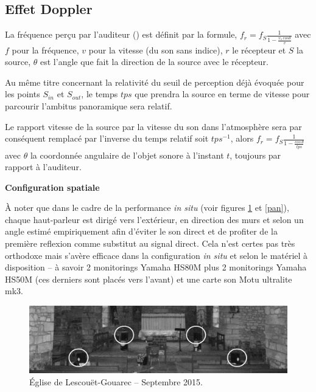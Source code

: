 \normalfont

\subsection*{Effet Doppler}

La fr\'equence per\c{c}u par l'auditeur () est d\'efinit par la formule,
$f_r= \displaystyle f_S  \frac{1}{\displaystyle 1- \frac{v_s \, cos \theta}{v}}$
avec $f$ pour la fr\'equence, $v$ pour la vitesse (du son sans indice), $r$ le r\'ecepteur et $S$ la source, $\theta$ est l'angle que fait la direction de la source avec le r\'ecepteur.

Au m\^eme titre concernant la relativit\'e du seuil de perception d\'ej\`a \'evoqu\'ee pour les points $S_{in}$ et $S_{out}$, le temps $tps$ que prendra la source en terme de vitesse pour parcourir l'ambitus panoramique sera relatif. 

Le rapport vitesse de la source par la vitesse du son dans l'atmosph\`ere sera par cons\'equent remplac\'e par l'inverse du temps relatif soit $tps^{-1}$, alors $f_r=f_S \displaystyle \frac{1}{1- \displaystyle \frac{cos \, \theta}{tps}}$ avec $\theta$ la coordonn\'ee angulaire de l'objet sonore \`a l'instant $t$, toujours par rapport \`a l'auditeur.

\newpage

\noindent \textbf{{\large Configuration spatiale}}
\hrulefill

  \bigskip
  
  \`A noter que dans le cadre de la performance \textit{in situ} (voir figures \ref{elg} et  \ref{pan}), chaque haut-parleur est dirig\'e vers l'ext\'erieur, en direction des murs et selon un angle estim\'e empiriquement afin d'\'eviter le son direct et de profiter de la premi\`ere reflexion comme substitut au signal direct. Cela n'est certes pas tr\`es orthodoxe mais s'av\`ere efficace dans la configuration \textit{in situ} et selon le mat\'eriel \`a disposition -- \`a savoir 2 monitorings Yamaha HS80M plus 2 monitorings Yamaha HS50M (ces derniers sont plac\'es vers l'avant) et une carte son Motu ultralite mk3.
  
 \begin{figure}[H]
  \hspace{-1.2cm}
\includegraphics[scale=0.36]{img/5923}
\caption{\'Eglise de Lescou\"et-Gouarec -- Septembre 2015.}
\label{elg}
\end{figure}

